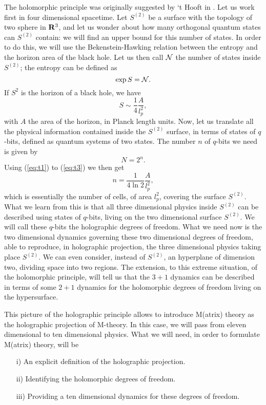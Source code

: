 The holomorphic principle was originally suggested by `t Hooft in
\cite{holo}. Let us work first in four dimensional spacetime. Let
$S^{(2)}$ be a surface with the topology of two sphere in ${\bf
R}^3$, and let us wonder about how many orthogonal quantum states
can $S^{(2)}$ contain: we will find an upper bound for this number
of states. In order to do this, we will use the
Bekenstein-Hawking relation between the entropy and the horizon
area of the black hole. Let us then call ${\cal N}$ the number of states
inside $S^{(2)}$; the entropy can be defined as
\begin{equation}
\exp S = {\cal N}.
\label{eq:t1}
\end{equation}
If $S^2$ is the horizon of a black hole, we have
\cite{Bekenstein}
\begin{equation}
S \sim \frac {1}{4} \frac {A}{l_p^2},
\label{eq:t2}
\end{equation}
with $A$ the area of the horizon, in Planck length units. Now,
let us translate all the physical information contained inside
the $S^{(2)}$ surface, in terms of states of $q$-bits, defined as
quantum systems of two states. The number $n$ of $q$-bits we need
is given by
\begin{equation}
N=2^n.
\label{eq:t3}
\end{equation}
Using (\ref{eq:t1}) to (\ref{eq:t3}) we then get
\begin{equation}
n= \frac {1}{4 \ln 2} \frac {A}{l_p^2},
\label{eq:t4}
\end{equation}
which is essentially the number of cells, of area $l_p^2$,
covering the surface $S^{(2)}$. What we learn from this is that all
three dimensional physics inside $S^{(2)}$ can be described using
states of $q$-bits, living on the two dimensional surface
$S^{(2)}$. We will call these $q$-bits the holographic degrees of
freedom. What we need now is the two dimensional dynamics
governing these two dimensional degrees of freedom, able to
reproduce, in holographic projection, the three dimensional
physics taking place $S^{(2)}$. We can even consider, instead of
$S^{(2)}$, an hyperplane of dimension two, dividing space into two
regions. The extension, to this extreme situation, of the
holomorphic principle, will tell us that the $3+1$ dynamics can
be described in terms of some $2+1$ dynamics for the holomorphic
degrees of freedom living on the hypersurface.
  
This picture of the holographic principle allows to introduce
M(atrix) theory \cite{BFSS} as the holographic projection of M-theory. In
this case, we will pass from eleven dimensional to ten
dimensional physics. What we will need, in order to formulate
M(atrix) theory, will be
\begin{itemize}
	\item[{i)}] An explicit definition of the holographic
projection.
	\item[{ii)}] Identifying the holomorphic degrees of
freedom.
	\item[{iii)}] Providing a ten dimensional dynamics for
these degrees of freedom.
\end{itemize}
  

